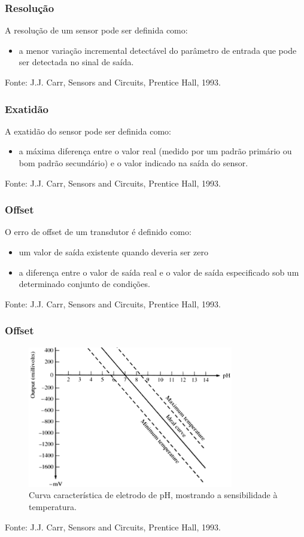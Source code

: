 \documentclass{beamer}
\begin{document}
\begin{frame}
	\frametitle{Resolução}
	A resolução de um sensor pode ser definida como:
	\begin{itemize}
		\item a menor variação incremental detectável do parâmetro de entrada que pode ser detectada no sinal de saída.
	\end{itemize}
	
	{\scriptsize Fonte: J.J. Carr, Sensors and Circuits, Prentice Hall, 1993.}
\end{frame}

\begin{frame}
	\frametitle{Exatidão}
	A exatidão do sensor pode ser definida como:
	\begin{itemize}
		\item a máxima diferença entre o valor real (medido por um padrão primário ou bom padrão secundário) e o valor indicado na saída do sensor.
	\end{itemize}
	{\scriptsize Fonte: J.J. Carr, Sensors and Circuits, Prentice Hall, 1993.}
\end{frame}

\begin{frame}
		\frametitle{Offset}
		O erro de offset de um transdutor é definido como:
		\begin{itemize}
			\item um valor de saída existente quando deveria ser zero
			\item a diferença entre o valor de saída real e o valor de saída especificado sob um determinado conjunto de condições.
		\end{itemize}  	
		{\scriptsize Fonte: J.J. Carr, Sensors and Circuits, Prentice Hall, 1993.}
\end{frame}

\begin{frame}
	\frametitle{Offset}
	\begin{figure}
		\includegraphics[width=0.8\textwidth]{offset}
		\caption{Curva característica de eletrodo de pH, mostrando a sensibilidade à temperatura.}
	\end{figure}  	
	{\scriptsize Fonte: J.J. Carr, Sensors and Circuits, Prentice Hall, 1993.}
\end{frame}
\end{document}
